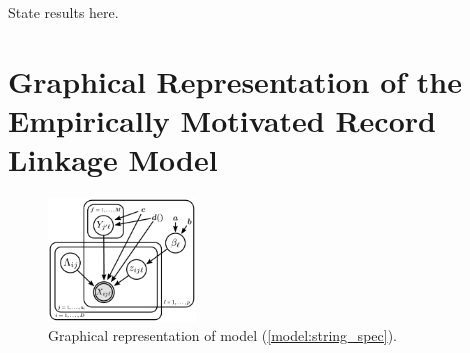 \documentclass[11pt]{article}\usepackage[]{graphicx}\usepackage[]{color}
\begin{document}
State results here.



\clearpage
\newpage




\clearpage
\newpage

\appendix
\section{Graphical Representation of the Empirically Motivated Record Linkage Model}

\begin{figure}[htbp]
\begin{center}
\includegraphics[width=0.35\textwidth]{figures/recordLinkage_graphicalModel}
\caption{Graphical representation of model (\ref{model:string_spec}).}
\label{fig:graphicalProcess}
\end{center}
\end{figure}
\end{document}
